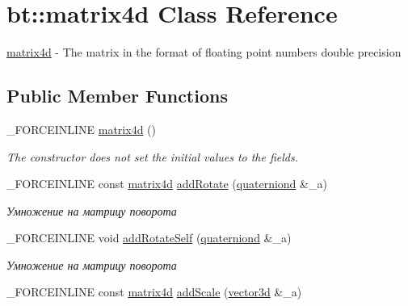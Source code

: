 \hypertarget{classbt_1_1matrix4d}{\section{bt\-:\-:matrix4d Class Reference}
\label{classbt_1_1matrix4d}
}


\hyperlink{classbt_1_1matrix4d}{matrix4d} -\/ The matrix in the format of floating point numbers double precision  


\subsection*{Public Member Functions}
\begin{DoxyCompactItemize}
\item 
\hypertarget{classbt_1_1matrix4d_a1548578e61d8c732dd060778a511acc8}{\-\_\-\-F\-O\-R\-C\-E\-I\-N\-L\-I\-N\-E \hyperlink{classbt_1_1matrix4d_a1548578e61d8c732dd060778a511acc8}{matrix4d} ()}\label{classbt_1_1matrix4d_a1548578e61d8c732dd060778a511acc8}

\begin{DoxyCompactList}\small\item\em The constructor does not set the initial values to the fields. \end{DoxyCompactList}\item 
\hypertarget{classbt_1_1matrix4d_a952b0e312742f3255606cefdcc99b77c}{\-\_\-\-F\-O\-R\-C\-E\-I\-N\-L\-I\-N\-E const \hyperlink{classbt_1_1matrix4d}{matrix4d} \hyperlink{classbt_1_1matrix4d_a952b0e312742f3255606cefdcc99b77c}{add\-Rotate} (\hyperlink{classbt_1_1quaterniond}{quaterniond} \&\-\_\-a)}\label{classbt_1_1matrix4d_a952b0e312742f3255606cefdcc99b77c}

\begin{DoxyCompactList}\small\item\em Умножение на матрицу поворота \end{DoxyCompactList}\item 
\hypertarget{classbt_1_1matrix4d_a9250c23760b4415c043cb80fd5c7b97a}{\-\_\-\-F\-O\-R\-C\-E\-I\-N\-L\-I\-N\-E void \hyperlink{classbt_1_1matrix4d_a9250c23760b4415c043cb80fd5c7b97a}{add\-Rotate\-Self} (\hyperlink{classbt_1_1quaterniond}{quaterniond} \&\-\_\-a)}\label{classbt_1_1matrix4d_a9250c23760b4415c043cb80fd5c7b97a}

\begin{DoxyCompactList}\small\item\em Умножение на матрицу поворота \end{DoxyCompactList}\item 
\hypertarget{classbt_1_1matrix4d_aa817a78aa0d33e9bb31f2f1a42abb975}{\-\_\-\-F\-O\-R\-C\-E\-I\-N\-L\-I\-N\-E const \hyperlink{classbt_1_1matrix4d}{matrix4d} \hyperlink{classbt_1_1matrix4d_aa817a78aa0d33e9bb31f2f1a42abb975}{add\-Scale} (\hyperlink{classbt_1_1vector3d}{vector3d} \&\-\_\-a)}\label{classbt_1_1matrix4d_aa817a78aa0d33e9bb31f2f1a42abb975}


\end{DoxyCompactItemize}
